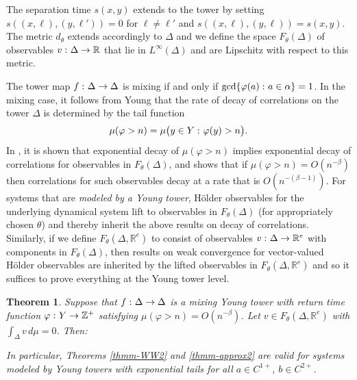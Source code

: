 \documentclass[aop,MSNbibl,seceqn,dvips]{arximspdf}
\newtheorem{thmm}{Theorem}[section]
\newcommand{\R}{\mathbb{R}}
\newcommand{\Z}{\mathbb{Z}}
\begin{document}
The separation time $s(x,y)$ extends to the tower by setting
$s((x,\ell),(y,\ell'))=0$ for $\ell\neq\ell'$ and
$s((x,\ell),(y,\ell))=s(x,y)$. The metric $d_\theta$ extends
accordingly to $\Delta$ and we define the space $F_\theta(\Delta)$ of
observables $v\dvtx\Delta\to\R$ that lie in $L^\infty(\Delta)$
and are
Lipschitz with respect to this metric.

The tower map $f\dvtx\Delta\to\Delta$ is mixing if and only if
$\gcd\{\varphi(a)\dvtx a\in\alpha\}=1$.
In the mixing case, it follows from Young \cite{Young98,Young99} that
the rate of decay of correlations on the tower $\Delta$ is determined
by the tail function
%
\[
\mu(\varphi>n)=\mu\bigl(y\in Y\dvtx\varphi(y)>n\bigr).
\]
%
In \cite{Young98}, it is shown that exponential decay of $\mu(\varphi>n)$
implies exponential decay of correlations for observables in $F_\theta
(\Delta)$,
and \cite{Young99} shows that if
$\mu(\varphi>n)=O(n^{-\beta})$ then correlations for such observables
decay at a rate that is
$O(n^{-(\beta-1)})$.
For systems that are \emph{modeled by a Young tower}, H\"older
observables for the underlying dynamical system lift to observables in
$F_\theta(\Delta)$
(for appropriately chosen $\theta$) and thereby inherit the above
results on decay of correlations. Similarly, if we define $F_\theta
(\Delta,\R^e)$ to consist of observables $v\dvtx\Delta\to\R^e$ with
components in $F_\theta(\Delta)$, then
results on weak convergence for vector-valued H\"older observables are
inherited by the lifted observables in
$F_\theta(\Delta,\R^e)$
and so it suffices to prove everything at the Young tower level.

\begin{thmm} \label{thmm-Young}
Suppose that $f\dvtx\Delta\to\Delta$ is a mixing Young tower with return
time function $\varphi\dvtx Y\to\Z^+$ satisfying
$\mu(\varphi>n)=O(n^{-\beta})$.
Let $v\in F_\theta(\Delta,\R^e)$ with $\int_\Delta v \,d\mu=0$. Then:
%
%
In particular, Theorems \ref{thmm-WW2} and \ref{thmm-approx2} are
valid for
systems modeled by Young towers with exponential tails
for all $a\in C^{1+}$, $b\in C^{2+}$.
\end{thmm}
\end{document}
